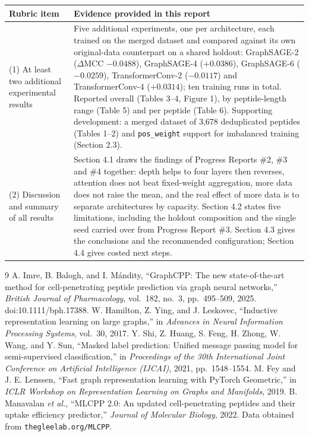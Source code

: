 \documentclass[11pt,a4paper]{article}
\newcommand{\code}[1]{\texttt{\small #1}}
\begin{document}
\begin{table}[h]
\centering\small
\begin{tabular}{@{}p{}p{}@{}}
\toprule
\sffamily\bfseries\color{navy}Rubric item & \sffamily\bfseries\color{navy}Evidence provided in this report\\
\midrule
(1) At least two additional experimental results &
Five additional experiments, one per architecture, each trained on the merged dataset and compared against
its own original-data counterpart on a shared holdout: GraphSAGE-2 ($\Delta$MCC $-0.0488$), GraphSAGE-4
($+0.0386$), GraphSAGE-6 ($-0.0259$), TransformerConv-2 ($-0.0117$) and TransformerConv-4 ($+0.0314$); ten
training runs in total. Reported overall (Tables 3--4, Figure 1), by peptide-length range (Table 5) and per
peptide (Table 6). Supporting development: a merged dataset of 3{,}678 deduplicated peptides (Tables 1--2)
and \code{pos\_weight} support for imbalanced training (Section 2.3).\\
\addlinespace
(2) Discussion and summary of all results &
Section 4.1 draws the findings of Progress Reports \#2, \#3 and \#4 together: depth helps to four layers
then reverses, attention does not beat fixed-weight aggregation, more data does not raise the mean, and the
real effect of more data is to separate architectures by capacity. Section 4.2 states five limitations,
including the holdout composition and the single seed carried over from Progress Report \#3. Section 4.3
gives the conclusions and the recommended configuration; Section 4.4 gives costed next steps.\\
\bottomrule
\end{tabular}
\end{table}

\begin{thebibliography}{9}
\footnotesize
{} A. Imre, B. Balogh, and I. M\'andity, ``GraphCPP: The new state-of-the-art method for
cell-penetrating peptide prediction via graph neural networks,'' \emph{British Journal of Pharmacology},
vol.~182, no.~3, pp.~495--509, 2025. doi:10.1111/bph.17388.
 W. Hamilton, Z. Ying, and J. Leskovec, ``Inductive representation learning on large
graphs,'' in \emph{Advances in Neural Information Processing Systems}, vol.~30, 2017.
 Y. Shi, Z. Huang, S. Feng, H. Zhong, W. Wang, and Y. Sun, ``Masked label
prediction: Unified message passing model for semi-supervised classification,'' in \emph{Proceedings of
the 30th International Joint Conference on Artificial Intelligence (IJCAI)}, 2021, pp.~1548--1554.
 M. Fey and J. E. Lenssen, ``Fast graph representation learning with PyTorch Geometric,'' in
\emph{ICLR Workshop on Representation Learning on Graphs and Manifolds}, 2019.
 B. Manavalan \emph{et al.}, ``MLCPP 2.0: An updated cell-penetrating peptides and their
uptake efficiency predictor,'' \emph{Journal of Molecular Biology}, 2022. Data obtained from
\texttt{thegleelab.org/MLCPP}.
\end{thebibliography}
\end{document}
